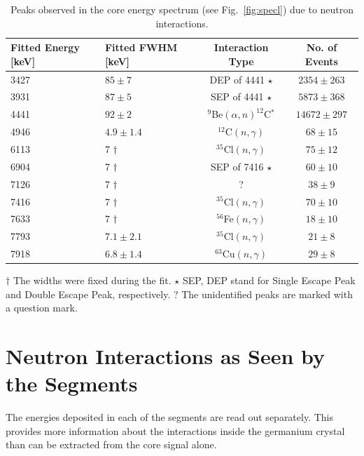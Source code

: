 \documentclass{elsart}
\begin{document}
\begin{table}[tbhp] 
  \caption{Peaks observed in the core energy spectrum (see Fig.~\ref{fig:specl})
    due to neutron interactions.} 
  \label{tab:peak2}
  \begin{tabular*}{\textwidth}{@{\extracolsep{\fill}}llcc}\hline\hline
    Fitted Energy [keV]&Fitted FWHM [keV]&Interaction Type&No. of Events\\\hline
    3427        & $85 \pm 7$    & DEP of 4441 $\star$            & $2354 \pm 263$ \\
    3931        & $87 \pm 5$    & SEP of 4441 $\star$            & $5873 \pm 368$ \\
    4441        & $92 \pm 2$    & $^{9}$Be$(\alpha,n)^{12}$C$^{*}$ & $14672 \pm 297$ \\
    4946        & $4.9\pm1.4$   & $^{12}$C$(n,\gamma)$            & $68 \pm 15$ \\
    6113        & 7 $\dag$      & $^{35}$Cl$(n,\gamma)$           & $75 \pm 12$ \\
    6904        & 7 $\dag$      & SEP of 7416 $\star$            & $60 \pm 10$ \\
    7126        & 7 $\dag$      & ?                              & $38 \pm  9$ \\
    7416        & 7 $\dag$      & $^{35}$Cl$(n,\gamma)$           & $70 \pm 10$ \\
    7633        & 7 $\dag$      & $^{56}$Fe$(n,\gamma)$           & $18 \pm 10$ \\
    7793        & $7.1\pm2.1$   & $^{35}$Cl$(n,\gamma)$           & $21 \pm  8$ \\
    7918        & $6.8\pm1.4$   & $^{63}$Cu$(n,\gamma)$           & $29 \pm  8$ \\
    \hline\hline
  \end{tabular*}
  $\dag$ The widths were fixed during the fit. \newline
  $\star$ SEP, DEP stand for Single Escape Peak and Double Escape Peak, respectively. \newline
  ? The unidentified peaks are marked with a question mark.
\end{table}

\section{Neutron Interactions as Seen by the Segments}
\label{sec:seg}
The energies deposited in each of the segments are read out
separately. This provides more information about the interactions
inside the germanium crystal than can be extracted from the core
signal alone.
\end{document}
